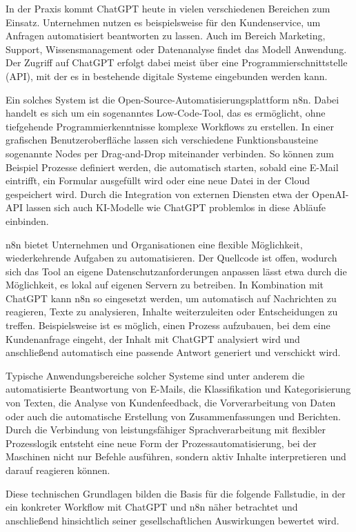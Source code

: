 \documentclass[utf8,biblatex]{bremerhaven_lni}
\begin{document}
In der Praxis kommt ChatGPT heute in vielen verschiedenen Bereichen zum Einsatz. Unternehmen nutzen es beispielsweise für den Kundenservice, um Anfragen automatisiert beantworten zu lassen. Auch im Bereich Marketing, Support, Wissensmanagement oder Datenanalyse findet das Modell Anwendung. Der Zugriff auf ChatGPT erfolgt dabei meist über eine Programmierschnittstelle (API), mit der es in bestehende digitale Systeme eingebunden werden kann.

Ein solches System ist die Open-Source-Automatisierungsplattform n8n. Dabei handelt es sich um ein sogenanntes Low-Code-Tool, das es ermöglicht, ohne tiefgehende Programmierkenntnisse komplexe Workflows zu erstellen. In einer grafischen Benutzeroberfläche lassen sich verschiedene Funktionsbausteine sogenannte Nodes per Drag-and-Drop miteinander verbinden. So können zum Beispiel Prozesse definiert werden, die automatisch starten, sobald eine E-Mail eintrifft, ein Formular ausgefüllt wird oder eine neue Datei in der Cloud gespeichert wird. Durch die Integration von externen Diensten etwa der OpenAI-API lassen sich auch KI-Modelle wie ChatGPT problemlos in diese Abläufe einbinden.

n8n bietet Unternehmen und Organisationen eine flexible Möglichkeit, wiederkehrende Aufgaben zu automatisieren. Der Quellcode ist offen, wodurch sich das Tool an eigene Datenschutzanforderungen anpassen lässt etwa durch die Möglichkeit, es lokal auf eigenen Servern zu betreiben. In Kombination mit ChatGPT kann n8n so eingesetzt werden, um automatisch auf Nachrichten zu reagieren, Texte zu analysieren, Inhalte weiterzuleiten oder Entscheidungen zu treffen. Beispielsweise ist es möglich, einen Prozess aufzubauen, bei dem eine Kundenanfrage eingeht, der Inhalt mit ChatGPT analysiert wird und anschließend automatisch eine passende Antwort generiert und verschickt wird.

Typische Anwendungsbereiche solcher Systeme sind unter anderem die automatisierte Beantwortung von E-Mails, die Klassifikation und Kategorisierung von Texten, die Analyse von Kundenfeedback, die Vorverarbeitung von Daten oder auch die automatische Erstellung von Zusammenfassungen und Berichten. Durch die Verbindung von leistungsfähiger Sprachverarbeitung mit flexibler Prozesslogik entsteht eine neue Form der Prozessautomatisierung, bei der Maschinen nicht nur Befehle ausführen, sondern aktiv Inhalte interpretieren und darauf reagieren können.

Diese technischen Grundlagen bilden die Basis für die folgende Fallstudie, in der ein konkreter Workflow mit ChatGPT und n8n näher betrachtet und anschließend hinsichtlich seiner gesellschaftlichen Auswirkungen bewertet wird.
\end{document}
